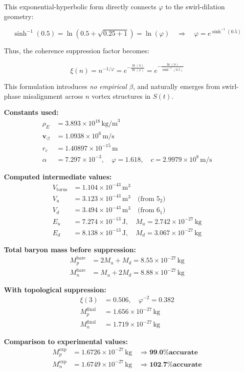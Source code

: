 This exponential-hyperbolic form directly connects $\varphi$ to the swirl-dilation geometry:

\[
\sinh^{-1}(0.5) = \ln\left( 0.5 + \sqrt{0.25 + 1} \right) = \ln(\varphi)
\quad \Rightarrow \quad
\varphi = e^{\sinh^{-1}(0.5)}
\]

Thus, the coherence suppression factor becomes:

\[
\boxed{
\xi(n) = n^{-1/\varphi} = e^{-\frac{\ln(n)}{\ln(\varphi)}} = e^{-\frac{\ln(n)}{\sinh^{-1}(0.5)}}
}
\]

This formulation introduces \emph{no empirical $\beta$}, and naturally emerges from swirl-phase misalignment across $n$ vortex structures in $S(t)$.

\textbf{Constants used:}
\begin{align*}
\rho_{\scriptscriptstyle\boldsymbol\!E}&= 3.893 \times 10^{18} \, \text{kg/m}^3 \\
\mathbf{v}_{\scriptscriptstyle\boldsymbol{\circlearrowleft}} &= 1.0938 \times 10^6 \, \text{m/s} \\
r_c &= 1.40897 \times 10^{-15} \, \text{m} \\
\alpha &= 7.297 \times 10^{-3}, \quad \varphi = 1.618, \quad c = 2.9979 \times 10^8 \, \text{m/s}
\end{align*}

\textbf{Computed intermediate values:}
\begin{align*}
V_{\text{torus}} &= 1.104 \times 10^{-43} \, \text{m}^3 \\
V_u &= 3.123 \times 10^{-43} \, \text{m}^3 \quad \text{(from } 5_2 \text{)} \\
V_d &= 3.494 \times 10^{-43} \, \text{m}^3 \quad \text{(from } 6_1 \text{)} \\
E_u &= 7.274 \times 10^{-13} \, \text{J}, \quad M_u = 2.742 \times 10^{-27} \, \text{kg} \\
E_d &= 8.138 \times 10^{-13} \, \text{J}, \quad M_d = 3.067 \times 10^{-27} \, \text{kg}
\end{align*}

\textbf{Total baryon mass before suppression:}
\begin{align*}
M_p^{\text{bare}} &= 2M_u + M_d = 8.55 \times 10^{-27} \, \text{kg} \\
M_n^{\text{bare}} &= M_u + 2M_d = 8.88 \times 10^{-27} \, \text{kg}
\end{align*}

\textbf{With topological suppression:}
\begin{align*}
\xi(3) &= 0.506, \quad \varphi^{-2} = 0.382 \\
M_p^{\text{final}} &= 1.656 \times 10^{-27} \, \text{kg} \\
M_n^{\text{final}} &= 1.719 \times 10^{-27} \, \text{kg}
\end{align*}

\textbf{Comparison to experimental values:}
\begin{align*}
M_p^{\text{exp}} &= 1.6726 \times 10^{-27} \, \text{kg} \quad \Rightarrow \textbf{99.0\% accurate} \\
M_n^{\text{exp}} &= 1.6749 \times 10^{-27} \, \text{kg} \quad \Rightarrow \textbf{102.7\% accurate}
\end{align*}
